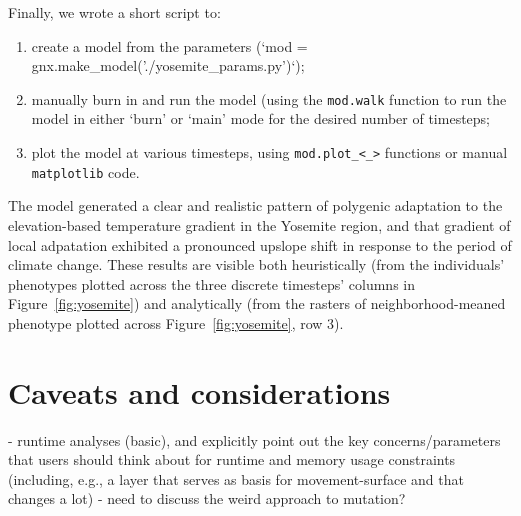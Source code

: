 ﻿\documentclass{article}
\begin{document}
Finally, we wrote a short script to:
\begin{enumerate}
  \item create a model from the parameters (`mod = gnx.make\_model('./yosemite\_params.py')`);
  \item manually burn in and run the model (using the \texttt{mod.walk} function to run the model
in either `burn' or `main' mode for the desired number of timesteps;
  \item plot the model at various timesteps, using \texttt{mod.plot\_<\_>} functions or manual \texttt{matplotlib} code.
\end{enumerate}

The model generated a clear and realistic pattern of polygenic adaptation to
the elevation-based temperature gradient in the Yosemite region, and that
gradient of local adpatation exhibited a pronounced upslope shift in response to
the period of climate change. These results are visible both heuristically
(from the individuals' phenotypes plotted across the three discrete timesteps' columns
in Figure~\ref{fig:yosemite})
and analytically (from the rasters of neighborhood-meaned phenotype plotted across
Figure~\ref{fig:yosemite}, row 3).


\section{Caveats and considerations}
- runtime analyses (basic), and explicitly point out the key concerns/parameters
that users should think about for runtime and memory usage constraints (including, e.g.,
a layer that serves as basis for movement-surface and that changes a lot)
- need to discuss the weird approach to mutation?
\end{document}
